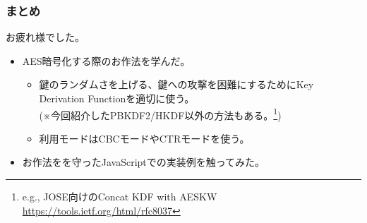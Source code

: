 \documentclass[12pt,dvipdfmx]{beamer}
\newcommand{\backupbegin}{
   \newcounter{framenumberappendix}
   \setcounter{framenumberappendix}{\value{framenumber}}
}
\newcommand{\backupend}{
   \addtocounter{framenumberappendix}{-\value{framenumber}}
   \addtocounter{framenumber}{\value{framenumberappendix}} 
}
\begin{document}
\begin{frame}
\frametitle{まとめ}
お疲れ様でした。

\begin{itemize}
\item AES暗号化する際のお作法を学んだ。
\begin{itemize}
 \item 鍵のランダムさを上げる、鍵への攻撃を困難にするためにKey Derivation Functionを適切に使う。\\
(※今回紹介したPBKDF2/HKDF以外の方法もある。\footnote[frame]{\scriptsize e.g., JOSE向けのConcat KDF with AESKW \url{https://tools.ietf.org/html/rfc8037}})
 \item 利用モードはCBCモードやCTRモードを使う。
\end{itemize}
\item お作法をを守ったJavaScriptでの実装例を触ってみた。
\end{itemize}
\end{frame}








 


\end{document}
